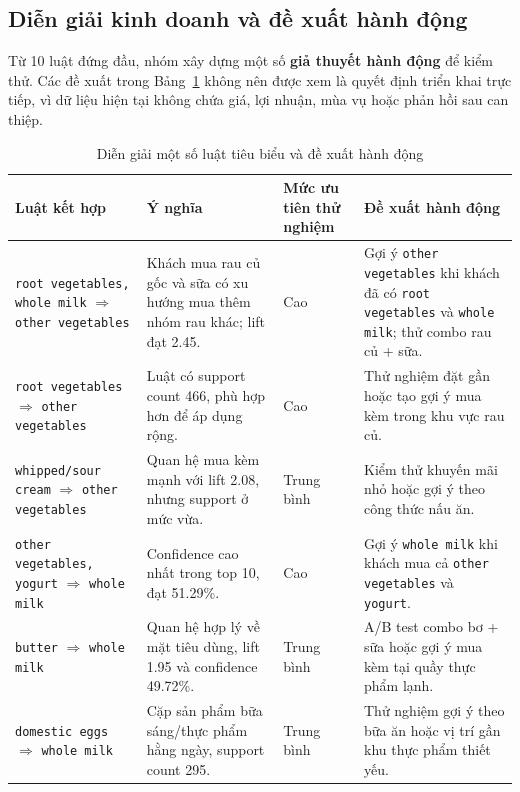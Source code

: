 \subsection{Diễn giải kinh doanh và đề xuất hành động}
\label{subsec:application-business-interpretation}

Từ 10 luật đứng đầu, nhóm xây dựng một số \textbf{giả thuyết hành động} để
kiểm thử. Các đề xuất trong Bảng~\ref{tab:application-business-actions} không
nên được xem là quyết định triển khai trực tiếp, vì dữ liệu hiện tại không chứa
giá, lợi nhuận, mùa vụ hoặc phản hồi sau can thiệp.

\begin{table}[H]
\centering
\caption{Diễn giải một số luật tiêu biểu và đề xuất hành động}
\label{tab:application-business-actions}
\footnotesize
\begin{tabularx}{\textwidth}{
    @{}
    >{\RaggedRight\arraybackslash}p{}
    >{\RaggedRight\arraybackslash}p{}
    >{\centering\arraybackslash}p{}
    >{\RaggedRight\arraybackslash}X
    @{}
}
\toprule
Luật kết hợp & Ý nghĩa & Mức ưu tiên thử nghiệm & Đề xuất hành động \\
\midrule
\texttt{root vegetables, whole milk} $\Rightarrow$ \texttt{other vegetables} & Khách mua rau củ gốc và sữa có xu hướng mua thêm nhóm rau khác; lift đạt 2.45. & Cao & Gợi ý \texttt{other vegetables} khi khách đã có \texttt{root vegetables} và \texttt{whole milk}; thử combo rau củ + sữa. \\
\texttt{root vegetables} $\Rightarrow$ \texttt{other vegetables} & Luật có support count 466, phù hợp hơn để áp dụng rộng. & Cao & Thử nghiệm đặt gần hoặc tạo gợi ý mua kèm trong khu vực rau củ. \\
\texttt{whipped/sour cream} $\Rightarrow$ \texttt{other vegetables} & Quan hệ mua kèm mạnh với lift 2.08, nhưng support ở mức vừa. & Trung bình & Kiểm thử khuyến mãi nhỏ hoặc gợi ý theo công thức nấu ăn. \\
\texttt{other vegetables, yogurt} $\Rightarrow$ \texttt{whole milk} & Confidence cao nhất trong top 10, đạt 51.29\%. & Cao & Gợi ý \texttt{whole milk} khi khách mua cả \texttt{other vegetables} và \texttt{yogurt}. \\
\texttt{butter} $\Rightarrow$ \texttt{whole milk} & Quan hệ hợp lý về mặt tiêu dùng, lift 1.95 và confidence 49.72\%. & Trung bình & A/B test combo bơ + sữa hoặc gợi ý mua kèm tại quầy thực phẩm lạnh. \\
\texttt{domestic eggs} $\Rightarrow$ \texttt{whole milk} & Cặp sản phẩm bữa sáng/thực phẩm hằng ngày, support count 295. & Trung bình & Thử nghiệm gợi ý theo bữa ăn hoặc vị trí gần khu thực phẩm thiết yếu. \\
\bottomrule
\end{tabularx}
\end{table}

